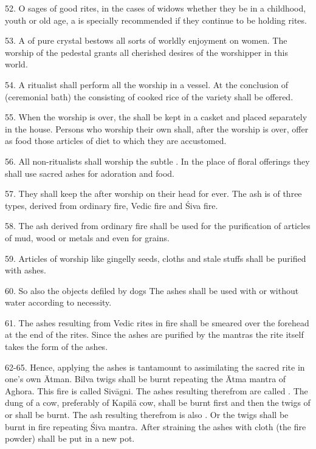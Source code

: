 52. O sages of good rites, in the cases of widows whether they be in a childhood,
youth or old age, a  is specially recommended if they continue to
be holding rites.

53. A  of pure crystal bestows all sorts of worldly enjoyment on women.
The worship of the pedestal grants all cherished desires of the worshipper in
this world.

54. A ritualist shall perform all the worship in a vessel. At the conclusion of
 (ceremonial bath) the  consisting of cooked rice of
the  variety shall be offered.

55. When the worship is over, the  shall be kept in a casket and
placed separately in the house. Persons who worship their own  shall,
after the worship is over, offer as food those articles of diet to which they
are accustomed.

56. All non-ritualists shall worship the subtle . In the place of
floral offerings they shall use sacred ashes for adoration and food.

57. They shall keep the  after worship on their head for ever. The ash
is of three types, derived from ordinary fire, Vedic fire and Śiva fire.

58. The ash derived from ordinary fire shall be used for the purification of
articles of mud, wood or metals and even for grains.

59. Articles of worship like gingelly seeds, cloths and stale stuffs shall be
purified with ashes.

60. So also the objects defiled by dogs \etc The ashes shall be used with or
without water according to necessity.

61. The ashes resulting from Vedic rites in fire shall be smeared over
the forehead at the end of the rites. Since the ashes are purified by
the mantras the rite itself takes the form of the ashes.

62-65. Hence, applying the ashes is tantamount to assimilating the sacred rite
in one’s own Ātman. Bilva twigs shall be burnt repeating the Ātma mantra of
Aghora. This fire is called Sivāgni. The ashes resulting therefrom are called
. The dung of a cow, preferably of Kapilā cow, shall be burnt
first and then the twigs of  or
 shall be burnt. The ash resulting therefrom is also .
Or the twigs shall be burnt in  fire repeating Śiva mantra. After
straining the ashes with cloth (the fire powder) shall be put in a new pot.

